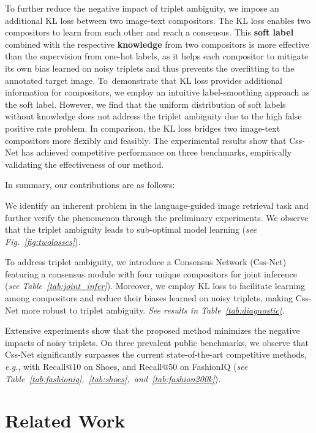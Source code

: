 \documentclass[sigconf]{acmart}
\def\eg{\emph{e.g.}}
\begin{document}
To further reduce the negative impact of triplet ambiguity, we impose an additional KL loss between two image-text compositors. The KL loss enables two compositors to learn from each other and reach a consensus. This \textbf{soft label} combined with the respective \textbf{knowledge} from two compositors is more effective than the supervision from one-hot labels, as it helps each compositor to mitigate its own bias learned on noisy triplets and thus prevents the overfitting to the annotated target image. To demonstrate that KL loss provides additional information for compositors, we employ an intuitive label-smoothing approach as the soft label. However, we find that the uniform distribution of soft labels without knowledge does not address the triplet ambiguity due to the high false positive rate problem. In comparison, the KL loss bridges two image-text compositors more flexibly and feasibly.
The experimental results show that Css-Net has achieved competitive performance on three benchmarks, empirically validating the effectiveness of our method.

In summary, our contributions are as follows:

     We identify an inherent problem in the language-guided image retrieval task and further verify the phenomenon through the preliminary experiments. We observe that the triplet ambiguity leads to sub-optimal model learning (\textit{see Fig.~\ref{fig:twolosses}}). 
    
     To address triplet ambiguity, we introduce a Consensus Network (Css-Net) featuring a consensus module with four unique compositors for joint inference (\textit{see Table~\ref{tab:joint_infer}}). Moreover, we employ KL loss to facilitate learning among compositors and reduce their biases learned on noisy triplets, making Css-Net more robust to triplet ambiguity. \textit{See results in Table~\ref{tab:diagnostic}.}
    
     Extensive experiments show that the proposed method minimizes the negative impacts of noisy triplets. On three prevalent public benchmarks, we observe that Css-Net significantly surpasses the current state-of-the-art competitive methods, \eg, with  Recall@10 on Shoes, and  Recall@50 on FashionIQ (\textit{see Table~\ref{tab:fashioniq},~\ref{tab:shoes},~and~\ref{tab:fashion200k}}).

\section{Related Work}
\end{document}
